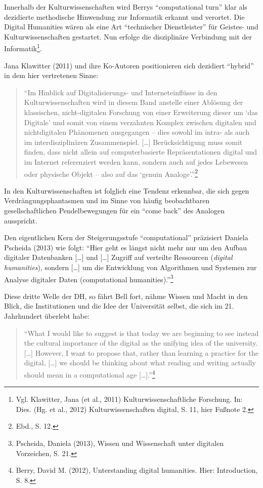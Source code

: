 \documentclass[a4paper,
fontsize=11pt,
oneside,
numbers=noperiodatend,
parskip=half-,
bibliography=totoc,
final
]{scrartcl}
\begin{document}
Innerhalb der Kulturwissenschaften wird Berrys \enquote{computational
turn} klar als dezidierte methodische Hinwendung zur Informatik erkannt
und verortet. Die Digital Humanities wären als eine Art
\enquote{technischer Dienstleister} für Geistes- und
Kulturwissenschaften gestartet. Nun erfolge die disziplinäre Verbindung
mit der Informatik\footnote{Vgl. Klawitter, Jana (et al., 2011)
  Kulturwissenschaftliche Forschung. In: Dies. (Hg. et al., 2012)
  Kulturwissenschaften digital, S. 11, hier Fußnote 2.}.

Jana Klawitter (2011) und ihre Ko-Autoren positionieren sich dezidiert
\enquote{hybrid} in dem hier vertretenen Sinne:

\begin{quote}
\enquote{Im Hinblick auf Digitalisierungs- und Interneteinflüsse in den
Kulturwissenschaften wird in diesem Band anstelle einer Ablösung der
klassischen, nicht-digitalen Forschung von einer Erweiterung dieser um
\enquote{das Digitale} und somit von einem verzahnten Komplex zwischen
digitalen und nichtdigitalen Phänomenen ausgegangen -- dies sowohl im
intra- als auch im interdisziplinären Zusammenspiel. {[}\ldots{}{]}
Berücksichtigung muss somit finden, dass nicht allein auf
computerbasierte Repräsentationen digital und im Internet referenziert
werden kann, sondern auch auf jedes Lebewesen oder physische Objekt --
also auf das \enquote{genuin Analoge}.}\footnote{Ebd., S. 12.}
\end{quote}

In den Kulturwissenschaften ist folglich eine Tendenz erkennbar, die
sich gegen Verdrängungsphantasmen und im Sinne von häufig beobachtbaren
gesellschaftlichen Pendelbewegungen für ein \enquote{come back} des
Analogen ausspricht.

Den eigentlichen Kern der Steigerungsstufe \enquote{computational}
präzisiert Daniela Pscheida (2013) wie folgt: \enquote{Hier geht es
längst nicht mehr nur um den Aufbau digitaler Datenbanken {[}\ldots{}{]}
und {[}\ldots{}{]} Zugriff auf verteilte Ressourcen (\emph{digital
humanities}), sondern {[}\ldots{}{]} um die Entwicklung von Algorithmen
und Systemen zur Analyse digitaler Daten (computational
humanities).}\footnote{Pscheida, Daniela (2013), Wissen und Wissenschaft
  unter digitalen Vorzeichen, S. 21.}

Diese dritte Welle der DH, so fährt Bell fort, nähme Wissen und Macht in
den Blick, die Institutionen und die Idee der Universität selbst, die
sich im 21. Jahrhundert überlebt habe:

\begin{quote}
\enquote{What I would like to suggest is that today we are beginning to
see instead the cultural importance of the digital as the unifying idea
of the university. {[}\ldots{}{]} However, I want to propose that,
rather than learning a practice for the digital, {[}\ldots{}{]} we
should be thinking about what reading and writing actually should mean
in a computational age {[}\ldots{}{]}.}\footnote{Berry, David M. (2012),
  Unterstanding digital humanities. Hier: Introduction, S. 8.}
\end{quote}
\end{document}
